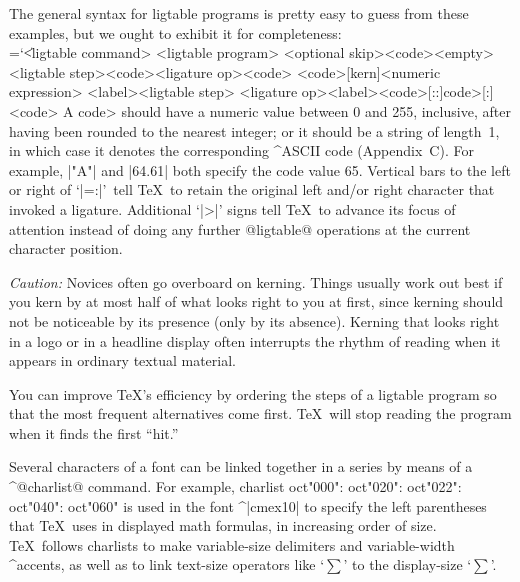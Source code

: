 The general syntax for ligtable programs is pretty easy to guess from
these examples, but we ought to exhibit it for completeness:
\beginsyntax \chardef\\=`\|
<ligtable command>
<ligtable program>
<optional skip>\is[,][skipto]<code>\alt<empty>
<ligtable step>\is<code><ligature op><code>
 \alt<code>[kern]<numeric expression>
 \alt<label><ligtable step>
<ligature op>\is[=:]\alt[\\=:]\alt[\\=:>]\alt[=:\\]\alt[=:\\>]%
  \alt[\\=:\\]\alt[\\=:\\>]\alt[\\=:\\>>]
<label>\alt<code>[::]\is\<code>[:]
<code>
\endsyntax
A \<code> should have a numeric value between 0 and 255, inclusive,
after having been rounded to the nearest integer; or it should be a
string of length~1, in which case it denotes the corresponding
^{ASCII} code (Appendix~C\null). For example, |"A"| and |64.61| both
specify the code value 65. Vertical bars to the left or right of `|=:|'\
tell \TeX\ to retain the original left and/or right character that invoked a
ligature. Additional `|>|' signs tell \TeX\ to advance its focus of attention
instead of doing any further @ligtable@ operations at the current
character position.

{\sl Caution:\/} Novices often go overboard on kerning. Things usually
work out best if you kern by at most half of what looks right to you
at first, since kerning should not be noticeable by its presence
(only by its absence). Kerning that looks right in a logo or in a
headline display often interrupts the rhythm of reading when it appears
in ordinary textual material.

You can improve \TeX's efficiency by ordering the steps of a ligtable
program so that the most frequent alternatives come first.
\TeX\ will stop reading the program when it finds the first ``hit.''

\medbreak
Several characters of a font can be linked together in a series
by means of a ^@charlist@ command. For example,
\begintt
charlist oct"000": oct"020": oct"022": oct"040": oct"060"
\endtt
is used in the font ^|cmex10| to specify the left parentheses that
\TeX\ uses in displayed math formulas, in increasing order of size.
\TeX\ follows charlists to make variable-size delimiters and
variable-width ^{accents}, as well as to link text-size operators
like `$\sum$' to the display-size `$\displaystyle\sum$'.

